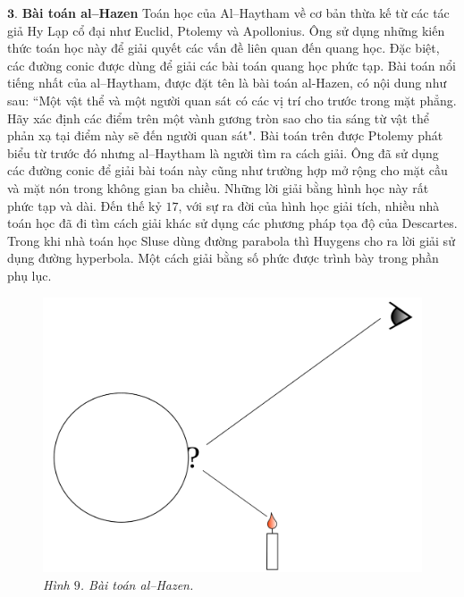 \begin{multicols}{2}
\begin{figure}[H]
		\vspace*{-10pt}
	\end{figure}
	$\pmb{3.}$ \textbf{\color{lichsutoanhoc}Bài toán al--Hazen}
	\vskip 0.1cm
	Toán học của Al--Haytham về cơ bản thừa kế từ các tác giả Hy Lạp cổ đại như Euclid, Ptolemy và Apollonius. Ông sử dụng những kiến thức toán học này để giải quyết các vấn đề liên quan đến quang học. Đặc biệt, các đường conic được dùng để giải các bài toán quang học phức tạp.
	\vskip 0.1cm
	Bài toán nổi tiếng nhất của al--Haytham, được đặt tên là bài toán al-Hazen, có nội dung như sau:
	\vskip 0.1cm
	``Một vật thể và một người quan sát có các vị trí cho trước trong mặt phẳng. Hãy xác định các điểm trên một vành gương tròn sao cho tia sáng từ vật thể phản xạ tại điểm này sẽ đến người quan sát".
	\vskip 0.1cm
	Bài toán trên được Ptolemy phát biểu từ trước đó nhưng al--Haytham là người tìm ra cách giải. Ông đã sử dụng các đường conic để giải bài toán này cũng như trường hợp mở rộng cho mặt cầu và mặt nón trong không gian ba chiều. Những lời giải bằng hình học này rất phức tạp và dài. Đến thế kỷ $17$, với sự ra đời của hình học giải tích, nhiều nhà toán học đã đi tìm cách giải khác sử dụng các phương pháp tọa độ của Descartes. Trong khi nhà toán học Sluse dùng đường parabola thì Huygens cho ra lời giải sử dụng đường hyperbola. Một cách giải bằng số phức được trình bày trong phần phụ lục.
	\begin{figure}[H]
		\vspace*{-10pt}
		\centering
		\captionsetup{labelformat= empty, justification=centering}
		\includegraphics[width= 1\linewidth]{10}
		\caption{\small\textit{\color{lichsutoanhoc}Hình $9$. Bài toán al--Hazen.}}

\end{figure}
\end{multicols}
